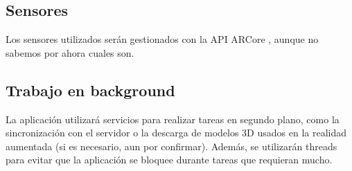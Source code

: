 \documentclass[a4paper, openright, 12pt]{article}
\begin{document}
\subsection{Sensores}
Los sensores utilizados serán gestionados con la API ARCore \cite{ARCore}, aunque no sabemos por ahora cuales son.

\subsection{Trabajo en background}
La aplicación utilizará servicios para realizar tareas en segundo plano, como la sincronización con el servidor o la descarga de modelos 3D usados en la realidad aumentada (si es necesario, aun por confirmar). Además, se utilizarán threads para evitar que la aplicación se bloquee durante tareas que requieran mucho.



\end{document}
